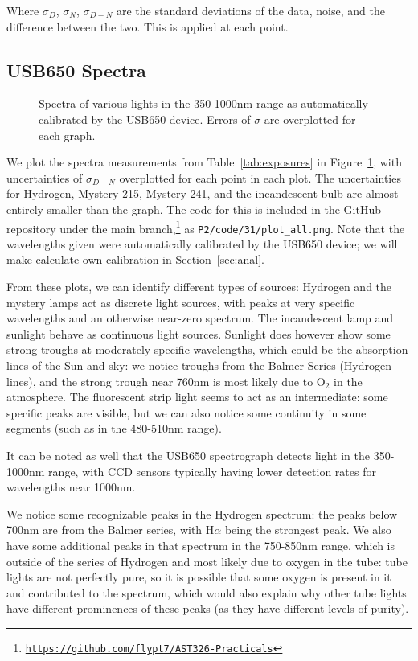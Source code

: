 \documentclass[twocolumn]{aastex702}
\begin{document}
			Where $\sigma_D$, $\sigma_N$, $\sigma_{D-N}$ are the standard deviations of the data, noise, and the difference between the two. This is applied at each point.
			
		\subsection{USB650 Spectra}\label{ssec:USB650-cal}
			
			\begin{figure}
				\caption{Spectra of various lights in the 350-1000nm range as automatically calibrated by the USB650 device. Errors of $\sigma$ are overplotted for each graph.}
				\label{fig:31-spectra}
			\end{figure}
			
			We plot the spectra measurements from Table~\ref{tab:exposures} in Figure~\ref{fig:31-spectra}, with uncertainties of $\sigma_{D-N}$ overplotted for each point in each plot. The uncertainties for Hydrogen, Mystery 215, Mystery 241, and the incandescent bulb are almost entirely smaller than the graph. The code for this is included in the GitHub repository under the main branch,\footnote{\texttt{\href{https://github.com/flypt7/AST326-Practicals}{https://github.com/flypt7/AST326-Practicals}}} as \texttt{P2/code/31/plot\_all.png}. Note that the wavelengths given were automatically calibrated by the USB650 device; we will make calculate own calibration in Section~\ref{sec:anal}.
			
			From these plots, we can identify different types of sources: Hydrogen and the mystery lamps act as discrete light sources, with peaks at very specific wavelengths and an otherwise near-zero spectrum. The incandescent lamp and sunlight behave as continuous light sources. Sunlight does however show some strong troughs at moderately specific wavelengths, which could be the absorption lines of the Sun and sky: we notice troughs from the Balmer Series (Hydrogen lines), and the strong trough near 760nm is most likely due to O$_2$ in the atmosphere. The fluorescent strip light seems to act as an intermediate: some specific peaks are visible, but we can also notice some continuity in some segments (such as in the 480-510nm range).
			
			It can be noted as well that the USB650 spectrograph detects light in the 350-1000nm range, with CCD sensors typically having lower detection rates for wavelengths near 1000nm.
			
			We notice some recognizable peaks in the Hydrogen spectrum: the peaks below 700nm are from the Balmer series, with H$\alpha$ being the strongest peak. We also have some additional peaks in that spectrum in the 750-850nm range, which is outside of the series of Hydrogen and most likely due to oxygen in the tube: tube lights are not perfectly pure, so it is possible that some oxygen is present in it and contributed to the spectrum, which would also explain why other tube lights have different prominences of these peaks (as they have different levels of purity).
			
\end{document}
